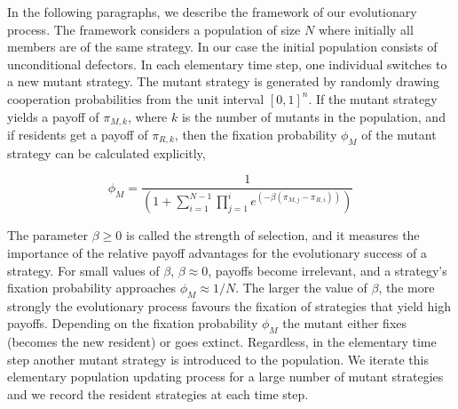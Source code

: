 \documentclass{article}
\theoremstyle{definition}
\begin{document}
In the following paragraphs, we describe the framework of our evolutionary
process. The framework considers a population of size \(N\) where initially all
members are of the same strategy. In our case the initial population consists of
unconditional defectors. In each elementary time step, one individual switches
to a new mutant strategy. The mutant strategy is generated by randomly drawing
cooperation probabilities from the unit interval \([0,1]^n\). If the mutant
strategy yields a payoff of \(\pi_{M, k}\), where \(k\) is the number of
mutants in the population, and if residents get a payoff of \(\pi_{R,
k}\), then the fixation probability \(\phi_{M}\) of the mutant strategy can be
calculated explicitly,

\begin{equation}\label{eq:fixation_probability}
  \phi_{M} = \frac{1}{\left(1 + \displaystyle \sum_{i=1}^{N - 1} \prod_{j=1}^{i} e^{(- \beta (\pi_{M, j} - \pi_{R, i}))} \right)}
\end{equation}

The parameter \(\beta \geq 0\) is called the strength of selection, and it
measures the importance of the relative payoff advantages for the evolutionary
success of a strategy. For small values of \(\beta\), \(\beta \approx 0\),
payoffs become irrelevant, and a strategy's fixation probability approaches
\(\phi_{M} \approx 1 / N\). The larger the value of \(\beta\), the more strongly
the evolutionary process favours the fixation of strategies that yield high
payoffs.
Depending on the fixation probability \(\phi_{M}\) the mutant either fixes
(becomes the new resident) or goes extinct. Regardless, in the elementary time
step another mutant strategy is introduced to the  population. We iterate this
elementary population updating process for a large number of mutant strategies
and we record the resident strategies at each time step.

{\setlength{\bibsep}{0\baselineskip}


}
\end{document}
